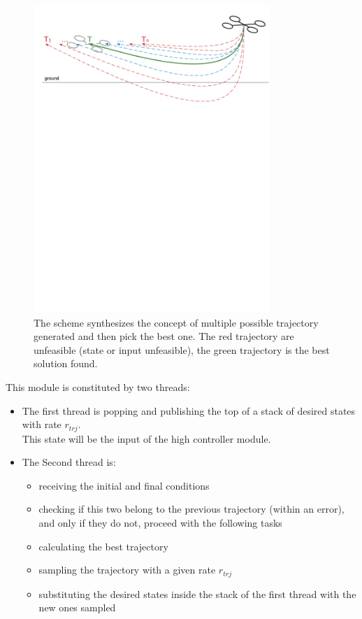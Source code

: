 \begin{figure}[!htbp]
    \centering
    \includegraphics[width=0.8\textwidth]{img/trajectory_generation.pdf}
    \caption{The scheme synthesizes the concept of multiple possible trajectory generated and then pick the best one. The red trajectory are unfeasible (state or input unfeasible), the green trajectory is the best solution found.}
    \label{fig:traject_gen}
\end{figure}

This module is constituted by two threads:
\begin{itemize}
\item The first thread is popping and publishing the top of a stack of desired states with rate $r_{trj}$. \\
This state will be the input of the high controller module.
\item The Second thread is:
\begin{itemize}
\item receiving the initial and final conditions
\item checking if this two belong to the previous trajectory (within an error), and only if they do not, proceed with the following tasks
\item calculating the best trajectory
\item sampling the trajectory with a given rate $r_{trj}$
\item substituting the desired states inside the stack of the first thread with the new ones sampled
\end{itemize}
\end{itemize}


